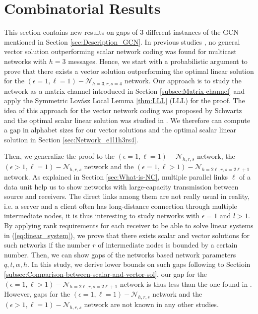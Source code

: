 \chapter{Combinatorial Results} \label{chap:comb_res}

This section contains new results on gaps of 3 different instances
of the GCN mentioned in Section \ref{sec:Description_GCN}. In previous
studies \cite{Wachter-Zeh:2018}, no general vector solution outperforming
scalar network coding was found for multicast networks with $h=3$
messages. Hence, we start with a probabilistic argument to prove that
there exists a vector solution outperforming the optimal linear solution
for the $\left(\epsilon=1,\ell=1\right)-\mathcal{N}_{h=3,r,s=4}$
network. Our approach is to study the network as a matrix channel
introduced in Section \ref{subsec:Matrix-channel} and apply the Symmetric
Lov\'asz Local Lemma \ref{thm:LLL} (LLL) for the proof. The idea
of this approach for the vector network coding was proposed by Schwartz
\cite{MosheSchwartz:2018} and the optimal scalar linear solution
was studied in \cite{Wachter-Zeh:2018}. We therefore can compute
a gap in alphabet sizes for our vector solutions and the optimal scalar
linear solution in Section \ref{sec:Network_e1l1h3rs4}. 

Then, we generalize the proof to the $\left(\epsilon=1,\ell=1\right)-\mathcal{N}_{h,r,s}$
network, the $\left(\epsilon>1,\ell=1\right)-\mathcal{N}_{h,r,s}$
network and the $\left(\epsilon=1,\ell>1\right)-\mathcal{N}_{h=2\ell,r,s=2\ell+1}$
network. As explained in Section \ref{sec:What-is-NC}, multiple parallel
links $\ell$ of a data unit help us to show networks with large-capacity
transmission between source and receivers. The direct links among
them are not really usual in reality, i.e. a server and a client often
has long-distance connection through multiple intermediate nodes,
it is thus interesting to study networks with $\epsilon=1$ and $l>1$.
By applying rank requirements for each receiver to be able to solve
linear systems in (\ref{eq:linear_system}), we prove that there exists
scalar and vector solutions for such networks if the number $r$ of
intermediate nodes is bounded by a certain number. Then, we can show
gaps of the networks based network parameters $q,t,\alpha,h$. In
this study, we derive lower bounds on such gaps following to Sectioin
\ref{subsec:Comparison-between-scalar-and-vector-sol}, our gap for
the $\left(\epsilon=1,\ell>1\right)-\mathcal{N}_{h=2\ell,r,s=2\ell+1}$
network is thus less than the one found in \cite{Wachter-Zeh:2018}.
However, gaps for the $\left(\epsilon=1,\ell=1\right)-\mathcal{N}_{h,r,s}$
network and the $\left(\epsilon>1,\ell=1\right)-\mathcal{N}_{h,r,s}$
network are not known in any other studies.

